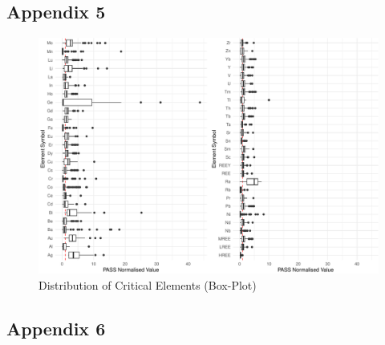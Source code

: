 \documentclass[11pt,a4paper,]{article}
\begin{document}
\subsection{Appendix 5}\label{appendix-five}

\begin{figure}

{\centering \includegraphics[width=1\linewidth]{Final_report_files/figure-latex/element-dist-1} 

}

\caption{Distribution of Critical Elements (Box-Plot)}\label{fig:element-dist}
\end{figure}

\newpage

\subsection{Appendix 6}\label{appendix-six}
\end{document}
